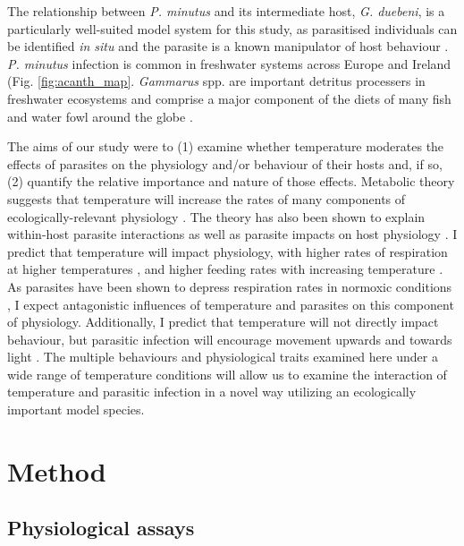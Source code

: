 The relationship between \emph{P. minutus} and its intermediate host, \emph{G. duebeni}, is a particularly well-suited model system for this study, as parasitised individuals can be identified \emph{in situ} and the parasite is a known manipulator of host behaviour \citep{moore1996, fielding2003, benesh2005, perrot2007, jacquin2014}. \emph{P. minutus} infection is common in freshwater systems across Europe \citep{medoc2006} and Ireland (Fig. \ref{fig:acanth_map}. \emph{Gammarus} spp. are important detritus processers in freshwater ecosystems \citep{macneil1997, sutcliffe2000} and comprise a major component of the diets of many fish and water fowl around the globe \citep{mortensen1982, byers2010}.

The aims of our study were to (1) examine whether temperature moderates the effects of parasites on the physiology and/or behaviour of their hosts and, if so, (2) quantify the relative importance and nature of those effects. Metabolic theory suggests that temperature will increase the rates of many components of ecologically-relevant physiology \citep{brown2004, kordas2011}. The theory has also been shown to explain within-host parasite interactions as well as parasite impacts on host physiology \citep{kirk2018}. I predict that temperature will impact physiology, with higher rates of respiration at higher temperatures \citep{halcrow1967, bulnheim1979}, and higher feeding rates with increasing temperature \citep{nilsson1974}. As parasites have been shown to depress respiration rates in normoxic conditions \citep{perrot2016}, I expect antagonistic influences of temperature and parasites on this component of physiology. Additionally, I predict that temperature will not directly impact behaviour, but parasitic infection will encourage movement upwards and towards light \citep{labaude2017}. The multiple behaviours and physiological traits examined here under a wide range of temperature conditions will allow us to examine the interaction of temperature and parasitic infection in a novel way utilizing an ecologically important model species. 

\section{Method}

\subsection{Physiological assays}

